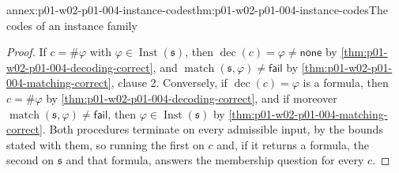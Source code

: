\begin{annexitem}{annex:p01-w02-p01-004-instance-codes}{thm:p01-w02-p01-004-instance-codes}{The codes of an instance family}
\begin{proof}
If \(c=\#\varphi\) with \(\varphi\in\operatorname{Inst}(\mathfrak s)\), then
\(\operatorname{dec}(c)=\varphi\ne\mathsf{none}\) by
\cref{thm:p01-w02-p01-004-decoding-correct}, and
\(\operatorname{match}(\mathfrak s,\varphi)\ne\mathsf{fail}\) by
\cref{thm:p01-w02-p01-004-matching-correct}, clause 2. Conversely, if
\(\operatorname{dec}(c)=\varphi\) is a formula, then \(c=\#\varphi\) by
\cref{thm:p01-w02-p01-004-decoding-correct}, and if moreover
\(\operatorname{match}(\mathfrak s,\varphi)\ne\mathsf{fail}\), then
\(\varphi\in\operatorname{Inst}(\mathfrak s)\) by
\cref{thm:p01-w02-p01-004-matching-correct}. Both procedures terminate on
every admissible input, by the bounds stated with them, so running the first
on \(c\) and, if it returns a formula, the second on \(\mathfrak s\) and that
formula, answers the membership question for every \(c\).
\end{proof}
\end{annexitem}
